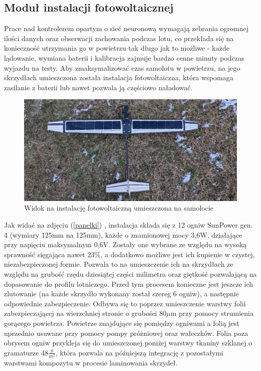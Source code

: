 \documentclass[12pt, a4paper]{article}
\let\oldref\ref
\renewcommand{\ref}[1]{(\oldref{#1})}
\begin{document}
 \FloatBarrier
\subsection{Moduł instalacji fotowoltaicznej}
Prace nad kontrolerem opartym o sieć neuronową wymagają zebrania ogromnej ilości danych oraz obserwacji zachowania podczas lotu, co przekłada się na konieczność utrzymania go w powietrzu tak długo jak to możliwe - każde lądowanie, wymiana baterii i kalibracja zajmuje bardzo cenne minuty podczas wyjazdu na testy. Aby zmaksymalizować czas samolotu w powietrzu, na jego skrzydłach umieszczona została instalacja fotowoltaiczna, która wspomaga zasilanie z baterii lub nawet pozwala ją częściowo naładować.

\begin{figure}[ht]
    \centering
    \includegraphics[width=1\textwidth]{panelki}
    \caption{Widok na instalację fotowoltaiczną umieszczona na samolocie}
    \label{fig:panelki}
\end{figure}

Jak widać na zdjęciu \ref{panelki} , instalacja składa się z 12 ogniw SunPower gen. 4 (wymiary 125mm na 125mm), każde o znamionowej mocy 3,6W, działające przy napięciu maksymalnym 0,6V. Zostały one wybrane ze względu na wysoką sprawność sięgająca nawet 23\%, a dodatkowo możliwe jest ich kupienie w czystej, niezabezpieczonej formie. Pozwala to na umieszczenie ich na skrzydłach ze względu na grubość rzędu dziesiątej części milimetra oraz giętkość pozwalającą na dopasowanie do profilu lotniczego. Przed tym procesem konieczne jest jeszcze ich zlutowanie (na każde skrzydło wykonany został szereg 6 ogniw), a następnie odpowiednie zabezpieczenie. Odbywa się to poprzez umieszczenie warstwy folii  zabezpieczającej na wierzchniej stronie o grubości 80$\mu$m przy pomocy strumienia gorącego powietrza. Powietrze znajdujące się pomiędzy ogniwami a folią jest uprzednio usuwane przy pomocy pompy próżniowej oraz wałeczków. Folia poza obrysem ogniw przykleja się do umieszczonej poniżej warstwy tkaniny szklanej o gramaturze 48$\frac{g}{m^2}$, która pozwala na późniejszą integrację z pozostałymi warstwami kompozytu w procesie laminowania skrzydeł.
\end{document}
